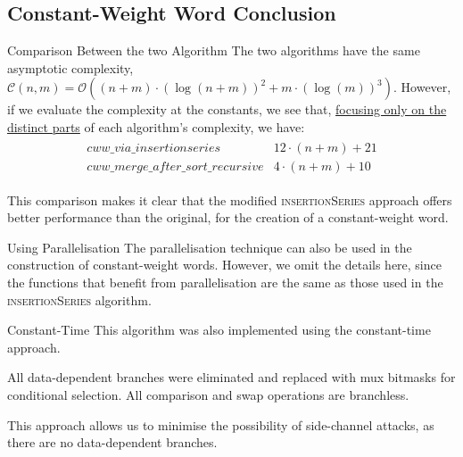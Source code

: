     \subsection{Constant-Weight Word Conclusion}
        \begin{frame}{Comparison Between the two Algorithm}
            The two algorithms have the same asymptotic complexity, $\mathcal{C}{\left(n, m\right)} = \mathcal{O}{\left(\left(n + m\right) \cdot \left(\log{\left(n + m\right)}\right)^2 + m \cdot \left(\log{\left(m\right)}\right)^3\right)}$. However, if we evaluate the complexity at the constants, we see that, \underline{focusing only on the distinct parts} of each algorithm's complexity, we have:
            \begin{align*}
                \begin{array}{rl}
                    cww\_via\_insertionseries & 12 \cdot \left(n + m\right) + 21 \\
                cww\_merge\_after\_sort\_recursive & 4 \cdot \left(n + m\right) + 10
                \end{array}
            \end{align*}

            This comparison makes it clear that the modified \textsc{insertionSeries} approach offers better performance than the original, for the creation of a constant-weight word.
        \end{frame}

        \begin{frame}{Using Parallelisation}
            The parallelisation technique can also be used in the construction of constant-weight words. However, we omit the details here, since the functions that benefit from parallelisation are the same as those used in the \textsc{insertionSeries} algorithm.
        \end{frame}

        \begin{frame}{Constant-Time}
            This algorithm was also implemented using the constant-time approach.

            \leavevmode

            All data-dependent branches were eliminated and replaced with mux bitmasks for conditional selection. All comparison and swap operations are branchless.

            This approach allows us to minimise the possibility of side-channel attacks, as there are no data-dependent branches.
        \end{frame}